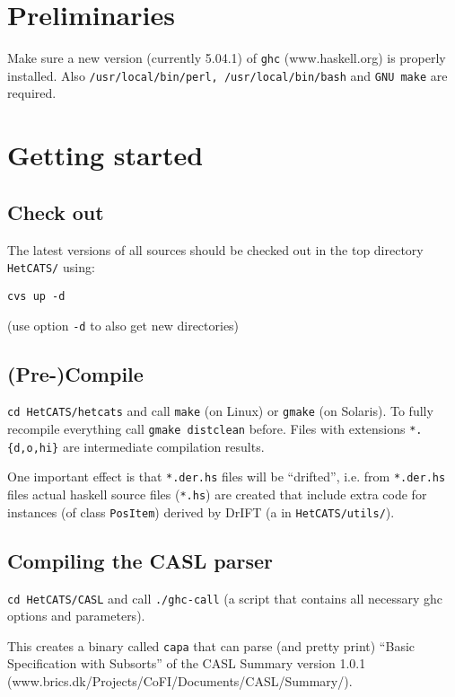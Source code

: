 \documentclass{article}
\begin{document}
\section{Preliminaries}

Make sure a new version (currently 5.04.1) of \texttt{ghc}
(www.haskell.org) is properly installed.  Also
\texttt{/usr/local/bin/perl, /usr/local/bin/bash} and \texttt{GNU
  make} are required.

\section{Getting started}

\subsection{Check out}
The latest versions of all sources should be checked out in the top
directory \texttt{HetCATS/} using:

\texttt{cvs up -d}

(use option \texttt{-d} to also get new directories)

\subsection{(Pre-)Compile}

\texttt{cd HetCATS/hetcats} and call \texttt{make} (on Linux) or
\texttt{gmake} (on Solaris). To fully recompile everything call
\texttt{gmake distclean} before. Files with extensions
\texttt{*.\{d,o,hi\}} are intermediate compilation results.

One important effect is that \texttt{*.der.hs} files will be
``drifted'', i.e.  from \texttt{*.der.hs} files actual haskell source
files (\texttt{*.hs}) are created that include extra code for
instances (of class \texttt{PosItem}) derived by DrIFT (a in
\texttt{HetCATS/utils/}).

\subsection{Compiling the CASL parser}

\texttt{cd HetCATS/CASL} and call \texttt{./ghc-call} (a script that
contains all necessary ghc options and parameters).

This creates a binary called \texttt{capa} that can parse (and pretty
print) ``Basic Specification with Subsorts'' of the CASL Summary
version 1.0.1 \\ (www.brics.dk/Projects/CoFI/Documents/CASL/Summary/).
\end{document}
